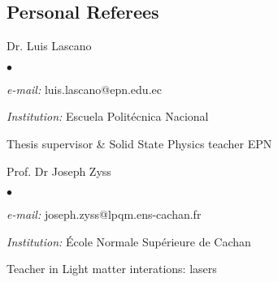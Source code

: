 \documentclass[margin,line]{res}
\newenvironment{list1}{
  \begin{list}{\ding{113}}{%
      \setlength{\itemsep}{0in}
      \setlength{\parsep}{0in} \setlength{\parskip}{0in}
      \setlength{\topsep}{0in} \setlength{\partopsep}{0in} 
      \setlength{\leftmargin}{0.17in}}}{\end{list}}
\newenvironment{list2}{
  \begin{list}{$\bullet$}{%
      \setlength{\itemsep}{0in}
      \setlength{\parsep}{0in} \setlength{\parskip}{0in}
      \setlength{\topsep}{0in} \setlength{\partopsep}{0in} 
      \setlength{\leftmargin}{0.2in}}}{\end{list}}
\begin{document}
\begin{resume}
\section{\sc Personal Referees}
 \begin{list1}
  \item[] Dr. Luis Lascano
  \begin{list2}
   \item {\it e-mail:} luis.lascano@epn.edu.ec
   \item {\it Institution:} Escuela Politécnica Nacional
   \item Thesis supervisor \& Solid State Physics teacher EPN
  \end{list2}
 \end{list1}
%  
 
 \begin{list1}
  \item[] Prof. Dr Joseph Zyss
  \begin{list2}
   \item {\it e-mail:} joseph.zyss@lpqm.ens-cachan.fr
   \item {\it Institution:}  École Normale Supérieure de Cachan
   \item Teacher in Light matter interations: lasers
  \end{list2}
 \end{list1}
 
%  


\end{resume}
\end{document}

